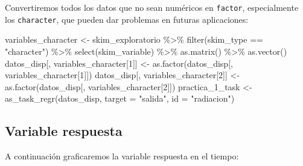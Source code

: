 \documentclass[
  11pt,
  a4paper,
]{article}
\newenvironment{Shaded}{\begin{snugshade}}{\end{snugshade}}
\newcommand{\AttributeTok}[1]{\textcolor[rgb]{0.77,0.63,0.00}{#1}}
\newcommand{\DecValTok}[1]{\textcolor[rgb]{0.00,0.00,0.81}{#1}}
\newcommand{\FunctionTok}[1]{\textcolor[rgb]{0.00,0.00,0.00}{#1}}
\newcommand{\NormalTok}[1]{#1}
\newcommand{\OtherTok}[1]{\textcolor[rgb]{0.56,0.35,0.01}{#1}}
\newcommand{\SpecialCharTok}[1]{\textcolor[rgb]{0.00,0.00,0.00}{#1}}
\newcommand{\StringTok}[1]{\textcolor[rgb]{0.31,0.60,0.02}{#1}}
\begin{document}
Convertiremos todos los datos que no sean numéricos en \texttt{factor},
especialmente los \texttt{character}, que pueden dar problemas en
futuras aplicaciones:

\begin{Shaded}
\begin{Highlighting}[]
\NormalTok{variables\_character }\OtherTok{\textless{}{-}}\NormalTok{ skim\_exploratorio }\SpecialCharTok{\%\textgreater{}\%} \FunctionTok{filter}\NormalTok{(skim\_type }\SpecialCharTok{==} \StringTok{"character"}\NormalTok{) }\SpecialCharTok{\%\textgreater{}\%} \FunctionTok{select}\NormalTok{(skim\_variable) }\SpecialCharTok{\%\textgreater{}\%} \FunctionTok{as.matrix}\NormalTok{() }\SpecialCharTok{\%\textgreater{}\%} \FunctionTok{as.vector}\NormalTok{()}
\NormalTok{datos\_disp[, variables\_character[}\DecValTok{1}\NormalTok{]] }\OtherTok{\textless{}{-}} \FunctionTok{as.factor}\NormalTok{(datos\_disp[, variables\_character[}\DecValTok{1}\NormalTok{]])}
\NormalTok{datos\_disp[, variables\_character[}\DecValTok{2}\NormalTok{]] }\OtherTok{\textless{}{-}} \FunctionTok{as.factor}\NormalTok{(datos\_disp[, variables\_character[}\DecValTok{2}\NormalTok{]])}
\NormalTok{practica\_1\_task }\OtherTok{\textless{}{-}} \FunctionTok{as\_task\_regr}\NormalTok{(datos\_disp, }\AttributeTok{target =} \StringTok{"salida"}\NormalTok{, }\AttributeTok{id =} \StringTok{"radiacion"}\NormalTok{)}
\end{Highlighting}
\end{Shaded}

\subsection{Variable respuesta}

A continuación graficaremos la variable respuesta en el tiempo:

\begin{Shaded}
\end{Shaded}
\end{document}
